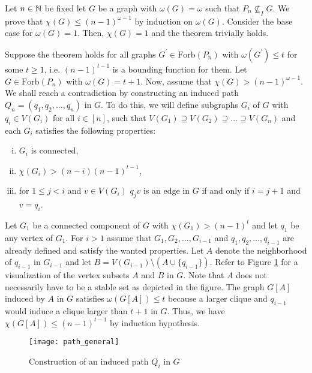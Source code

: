 \begin{prf}
Let $n\in\mathbb{N}$ be fixed let $G$ be a graph with $\omega (G)=\omega$ such that $P_n\nsubseteq_I G$. We prove that $\chi (G)\leq (n-1)^{\omega -1}$ by induction on $\omega (G)$. Consider the base case for $\omega (G) =1$. Then, $\chi (G) = 1$ and the theorem trivially holds.

Suppose the theorem holds for all graphs $G^\prime\in\text{Forb}(P_n)$ with $\omega (G^\prime ) \leq t$ for some $t\geq 1$, i.e. $(n-1)^{t-1}$ is a bounding function for them. Let $G\in\text{Forb}(P_n)$ with $\omega (G) = t + 1$. Now, assume that $\chi (G) > (n-1)^{\omega - 1}$. We shall reach a contradiction by constructing an induced path $Q_n=(q_1,q_2,\dots ,q_n)$ in $G$. To do this, we will define subgraphs $G_i$ of $G$ with $q_i\in V(G_i)$ for all $i\in [n]$, such that $V(G_1)\supseteq V(G_2)\supseteq \dots\supseteq V(G_n)$ and each $G_i$ satisfies the following properties:
\begin{enumerate}[(i)]
\item $G_i$ is connected,
\item $\chi (G_i) > (n-i)(n-1)^{t-1}$,
\item for $1\leq j<i$ and $v\in V(G_i)$ $q_jv$ is an edge in $G$ if and only if $i=j+1$ and $v = q_i$.
\end{enumerate}
Let $G_1$ be a connected component of $G$ with $\chi (G_1) >(n-1)^t$ and let $q_1$ be any vertex of $G_1$. For $i>1$ assume that $G_1,G_2,\dots , G_{i-1}$ and $q_1,q_2,\dots , q_{i-1}$ are already defined and satisfy the wanted properties. Let $A$ denote the neighborhood of $q_{i-1}$ in $G_{i-1}$ and let $B=V(G_{i-1})\setminus (A\cup\{q_{i-1}\})$. Refer to Figure \ref{f1cr} for a visualization of the vertex subsets $A$ and $B$ in $G$. Note that $A$ does not necessarily have to be a stable set as depicted in the figure. The graph $G[A]$ induced by $A$ in $G$ satisfies $\omega (G[A])\leq t$ because a larger clique and $q_{i-1}$ would induce a clique larger than $t+1$ in $G$. Thus, we have $\chi (G[A])\leq (n-1)^{t-1}$ by induction hypothesis.

\begin{figure}[ht]
\begin{center}
\texttt{[image: path\_general]}
\end{center}
\caption{Construction of an induced path $Q_i$ in $G$}
\label{f1cr}
\end{figure}



\end{prf}
